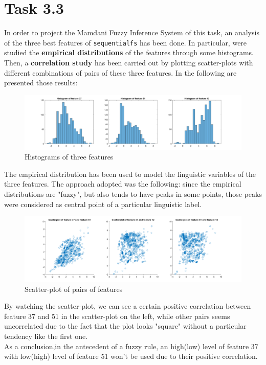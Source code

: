 \section{Task 3.3}
In order to project the Mamdani Fuzzy Inference System of this task, an analysis of the three best features of \verb|sequentialfs| has been done. In particular, were studied the \textbf{empirical distributions} of the features through some histograms. Then, a \textbf{correlation study} has been carried out by plotting scatter-plots with different combinations of pairs of these three features. In the following are presented those results:

\begin{figure}[H]
	\centering
	\includegraphics[width=\linewidth]{img/histogram_top_3_features.png}
	\caption{Histograms of three features}
\end{figure}

The empirical distribution has been used to model the linguistic variables of the three features. The approach adopted was the following: since the empirical distributions are "fuzzy", but also tends to have peaks in some points, those peaks were considered as central point of a particular linguistic label.

\begin{figure}[H]
	\centering
	\includegraphics[width=\linewidth]{img/scatter_top_3_features.png}
	\caption{Scatter-plot of pairs of features}
\end{figure}

By watching the scatter-plot, we can see a certain positive correlation between feature 37 and 51 in the scatter-plot on the left, while other pairs seems uncorrelated due to the fact that the plot looks "square" without a particular tendency like the first one. \\
As a conclusion,in the antecedent of a fuzzy rule, an high(low) level of feature 37 with low(high) level of feature 51 won't be used due to their positive correlation.\\

